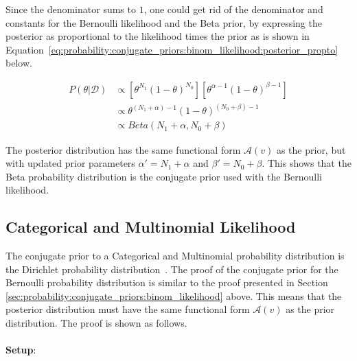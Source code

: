 Since the denominator sums to $1$, one could get rid of the denominator and constants for the Bernoulli likelihood and the Beta prior, by expressing the posterior as proportional to the likelihood times the prior as is shown in Equation~\eqref{eq:probability:conjugate_priors:binom_likelihood:posterior_propto} below.

\begin{equation}
      \label{eq:probability:conjugate_priors:binom_likelihood:posterior_propto}
      \begin{split}
            P(\theta | \mathcal{D}) &\propto \left[\theta^{N_{1}}(1-\theta)^{N_{0}}\right] \left[\theta^{\alpha - 1} (1 - \theta)^{\beta - 1}\right] \\
            &\propto \theta^{(N_{1} + \alpha) - 1}(1-\theta)^{(N_{0} + \beta) - 1} \\
            &\propto Beta(N_{1} + \alpha, N_{0} + \beta)
      \end{split}
\end{equation}

The posterior distribution has the same functional form $\mathcal{A}(v)$ as the prior, but with updated prior parameters $\alpha' = N_{1} + \alpha$ and $\beta' = N_{0} + \beta$. This shows that the Beta probability distribution is the conjugate prior used with the Bernoulli likelihood.


\subsection{Categorical and Multinomial Likelihood}
\label{sec:probability:conjugate_priors:cat_mult_likelihood}

The conjugate prior to a Categorical and Multinomial probability distribution is the Dirichlet probability distribution~\cite{ref:wackerly:2014}. The proof of the conjugate prior for the Bernoulli probability distribution is similar to the proof presented in Section \ref{sec:probability:conjugate_priors:binom_likelihood} above. This means that the posterior distribution must have the same functional form $\mathcal{A}(v)$ as the prior distribution. The proof is shown as follows. \\\\
\textbf{Setup}:

